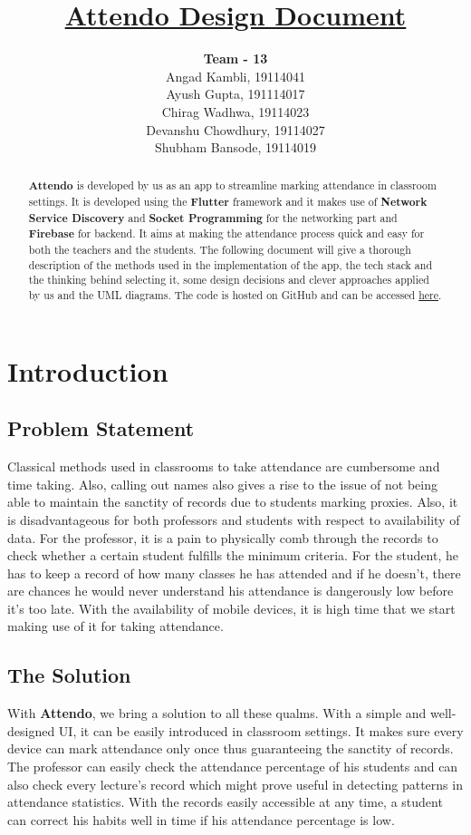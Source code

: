 \documentclass{article}
\title{\textbf{\underline{Attendo Design Document}}}
\author{
\textbf{Team - 13}\\
Angad Kambli, 19114041\\ 
Ayush Gupta, 191114017 \\ 
Chirag Wadhwa, 19114023 \\ 
Devanshu Chowdhury, 19114027 \\ 
Shubham Bansode, 19114019 }
\date{}
\begin{document}
\maketitle

\begin{abstract}
    \textbf{Attendo} is developed by us as an app to streamline marking attendance in classroom settings. It is developed using the \textbf{Flutter} framework and it makes use of \textbf{Network Service Discovery} and \textbf{Socket Programming} for the networking part and \textbf{Firebase} for backend. It aims at making the attendance process quick and easy for both the teachers and the students. The following document will give a thorough description of the methods used in the implementation of the app, the tech stack and the thinking behind selecting it, some design decisions and clever approaches applied by us and the UML diagrams. The code is hosted on GitHub and can be accessed \href{https://github.com/Attendo-App/Attendo}{here}.
\end{abstract}
\tableofcontents
\newpage

\section{Introduction}
\subsection{Problem Statement}
Classical methods used in classrooms to take attendance are cumbersome and time taking. Also, calling out names also gives a rise to the issue of not being able to maintain the sanctity of records due to students marking proxies. Also, it is disadvantageous for both professors and students with respect to availability of data. For the professor, it is a pain to physically comb through the records to check whether a certain student fulfills the minimum criteria. For the student, he has to keep a record of how many classes he has attended and if he doesn't, there are chances he would never understand his attendance is dangerously low before it's too late. With the availability of mobile devices, it is high time that we start making use of it for taking attendance.
\subsection{The Solution}
With \textbf{Attendo}, we bring a solution to all these qualms. With a simple and well-designed UI, it can be easily introduced in classroom settings. It makes sure every device can mark attendance only once thus guaranteeing the sanctity of records. The professor can easily check the attendance percentage of his students and can also check every lecture's record which might prove useful in detecting patterns in attendance statistics. With the records easily accessible at any time, a student can correct his habits well in time if his attendance percentage is low.
\end{document}
